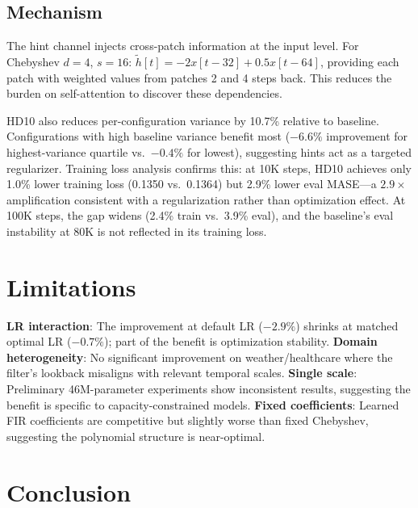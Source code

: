 \documentclass[letterpaper]{article}
\begin{document}
\subsection{Mechanism}

The hint channel injects cross-patch information at the input level. For Chebyshev $d{=}4$, $s{=}16$: $\tilde{h}[t] = -2x[t{-}32] + 0.5x[t{-}64]$, providing each patch with weighted values from patches 2 and 4 steps back. This reduces the burden on self-attention to discover these dependencies.

HD10 also reduces per-configuration variance by 10.7\% relative to baseline. Configurations with high baseline variance benefit most ($-6.6\%$ improvement for highest-variance quartile vs.\ $-0.4\%$ for lowest), suggesting hints act as a targeted regularizer. Training loss analysis confirms this: at 10K steps, HD10 achieves only 1.0\% lower training loss (0.1350 vs.\ 0.1364) but 2.9\% lower eval MASE---a $2.9\times$ amplification consistent with a regularization rather than optimization effect. At 100K steps, the gap widens (2.4\% train vs.\ 3.9\% eval), and the baseline's eval instability at 80K is not reflected in its training loss.

\section{Limitations}

\textbf{LR interaction}: The improvement at default LR ($-2.9\%$) shrinks at matched optimal LR ($-0.7\%$); part of the benefit is optimization stability.
\textbf{Domain heterogeneity}: No significant improvement on weather/healthcare where the filter's lookback misaligns with relevant temporal scales.
\textbf{Single scale}: Preliminary 46M-parameter experiments show inconsistent results, suggesting the benefit is specific to capacity-constrained models.
\textbf{Fixed coefficients}: Learned FIR coefficients are competitive but slightly worse than fixed Chebyshev, suggesting the polynomial structure is near-optimal.

\section{Conclusion}
\end{document}

